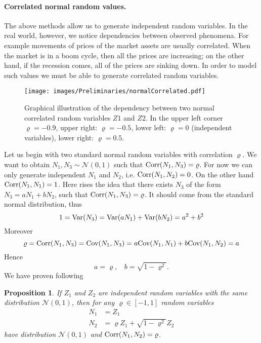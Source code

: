 \documentclass[a4paper,11pt, twoside]{book}
\newtheorem{prop}[thm]{Proposition}
\theoremstyle{definition}
\theoremstyle{remark}
\def\Var{{\rm Var}}
\def\Cov{{\hbox{Cov}}}
\def\Corr{{\hbox{Corr}}}
\begin{document}
\paragraph{Correlated normal random values.} The above methods allow us to generate independent random variables. In the real world, however, we notice dependencies between observed phenomena. For example movements of prices of the market assets are usually correlated. When the market is in a boom cycle, then all the prices are increasing; on the other hand, if the recession comes, all of the prices are sinking down.
In order to model such values we must be able to generate correlated random variables.

\begin{figure}[!ht]
\centering
 \texttt{[image: images/Preliminaries/normalCorrelated.pdf]}
\caption{Graphical illustration of the dependency between two normal correlated random variables $Z1$ and $Z2$. In the upper left corner $\varrho = -0.9$, upper right: $\varrho = -0.5$, lower left: $\varrho = 0$ (independent variables), lower right: $\varrho = 0.5$.}
\end{figure}

Let us begin with two standard normal random variables with correlation $\varrho$. We want to obtain $N_1, N_3 \sim \mathcal{N}(0,1)$ such that $\Corr(N_1, N_3) = \varrho$.  For now we can only generate independent $N_1$ and $N_2$, i.e. $\Corr(N_1, N_2) = 0$. On the other hand $\Corr(N_1, N_1) = 1$. Here rises the idea that there exists $N_3$ of the form $N_3 = a N_1 + b N_2$, such that $\Corr(N_1, N_3) = \varrho$.
It should come from the standard normal distribution, thus
\[ 1 = \Var(N_3) = \Var( a N_1) +  \Var(b N_2) = a^2 + b^2 \]
Moreover
\[ \varrho = \Corr(N_1, N_3) = \Cov(N_1, N_3) = a\Cov(N_1, N_1) + b\Cov(N_1, N_2) = a \]
Hence
\[ a = \varrho,\ \ \ \ b = \sqrt{1 - \varrho^2}. \]
We have proven following
\begin{prop}
 \label{prop:corrNorm}
 If $Z_1$ and $Z_2$ are independent random variables with the same distribution $\mathcal{N}(0,1)$, then for any $\varrho \in [-1,1]$ random variables
 \begin{align*}
 N_1 &= Z_1 \\
 N_2 &= \varrho Z_1 + \sqrt{1 - \varrho^2} Z_2
 \end{align*}
 have distribution $\mathcal{N}(0,1)$ and $\Corr(N_1, N_2) = \varrho$.
\end{prop}
\end{document}
